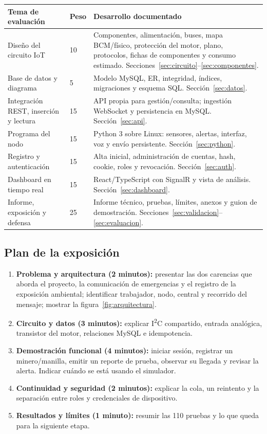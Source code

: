 \documentclass[10pt,a4paper]{article}
\begin{document}
\label{tab:evaluacion}
\begin{tabularx}{\linewidth}{@{}P{42mm}P{13mm}Y@{}}
\toprule\textbf{Tema de evaluación} & \textbf{Peso} & \textbf{Desarrollo documentado}\\\midrule
Diseño del circuito IoT & 10 & Componentes, alimentación, buses, mapa BCM/físico, protección del motor, plano, protocolos, fichas de componentes y consumo estimado. Secciones~\ref{sec:circuito}--\ref{sec:componentes}.\\
Base de datos y diagrama & 5 & Modelo MySQL, ER, integridad, índices, migraciones y esquema SQL. Sección~\ref{sec:datos}.\\
Integración REST, inserción y lectura & 15 & API propia para gestión/consulta; ingestión WebSocket y persistencia en MySQL. Sección~\ref{sec:api}.\\
Programa del nodo & 15 & Python 3 sobre Linux: sensores, alertas, interfaz, voz y envío persistente. Sección~\ref{sec:python}.\\
Registro y autenticación & 15 & Alta inicial, administración de cuentas, hash, cookie, roles y revocación. Sección~\ref{sec:auth}.\\
Dashboard en tiempo real & 15 & React/TypeScript con SignalR y vista de análisis. Sección~\ref{sec:dashboard}.\\
Informe, exposición y defensa & 25 & Informe técnico, pruebas, límites, anexos y guion de demostración. Secciones~\ref{sec:validacion}--\ref{sec:evaluacion}.\\\bottomrule
\end{tabularx}

\subsection{Plan de la exposición}
\begin{enumerate}
\item \textbf{Problema y arquitectura (2 minutos):} presentar las dos carencias que aborda el proyecto, la comunicación de emergencias y el registro de la exposición ambiental; identificar trabajador, nodo, central y recorrido del mensaje; mostrar la figura~\ref{fig:arquitectura}.
\item \textbf{Circuito y datos (3 minutos):} explicar I\textsuperscript{2}C compartido, entrada analógica, transistor del motor, relaciones MySQL e idempotencia.
\item \textbf{Demostración funcional (4 minutos):} iniciar sesión, registrar un minero/manilla, emitir un reporte de prueba, observar su llegada y revisar la alerta. Indicar cuándo se está usando el simulador.
\item \textbf{Continuidad y seguridad (2 minutos):} explicar la cola, un reintento y la separación entre roles y credenciales de dispositivo.
\item \textbf{Resultados y límites (1 minuto):} resumir las 110 pruebas y lo que queda para la siguiente etapa.
\end{enumerate}
\end{document}
